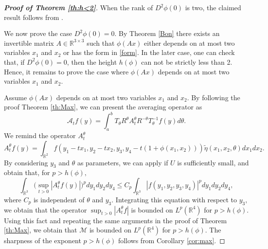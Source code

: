 \documentclass[a4paper, 11pt]{article}
\theoremstyle{plain}
\theoremstyle{definition}
\theoremstyle{lemma}
\theoremstyle{Remark}
\theoremstyle{proposition}
\theoremstyle{corollary}
\theoremstyle{example}
\theoremstyle{assumption}
\begin{document}
\bigskip

\begin{proof}[\textbf{Proof of Theorem \ref{th:h<2}}]
When the rank of $D^2\phi(0)$ is two, the claimed result follows from \cite[Theorem 2]{Gr}.

We now prove the case $D^2 \phi(0)=0.$
By Theorem \ref{Bon} there exists an invertible matrix $A\in \mathbb{R}^{3\times 3}$ such that
$ \phi(Ax)$ either depends on at most two variables $x_1$ and $x_2$ or has the form in \eqref{form}.
 In the later case, one can check that, if $D^2 \phi(0)=0$, then the height $h(\phi)$ can not be strictly less than 2. Hence, it remains to prove the case where $ \phi(Ax)$  depends on at most two variables $x_1$ and $x_2.$




 Assume $ \phi(Ax)$ depends on at most two variables $x_1$ and $x_2$. By following the proof Theorem \ref{th:Max}, we can present the averaging operator as
$$\mathcal{A}_t f(y)=\int_a^b T_{\theta}R^{\theta}{A}_t^{\theta}R^{-\theta}T_{\theta}^{-1} f(y)d\theta. $$
We remind the operator ${A}_t^{\theta}$
$$ {A}_t^{\theta} f(y)=
\int_{\mathbb{R}^2}f(y_1-tx_1,y_2-tx_2,y_3, y_4-t(1+ \phi(x_1,x_2))) \tilde{\eta} (x_1,x_2, \theta)dx_1dx_2.$$
 By considering $y_3$ and $\theta$ as  parameters, we can apply \cite[Theorem 1.2]{P1} if $U$ is sufficiently small, and obtain that, for $p>h(\phi),$
\begin{equation*}\int_{\mathbb{R}^3}\big(\sup_{t>0}|A^{\theta}_tf(y)| \big)^pdy_1dy_2dy_4\leq C_p \int_{\mathbb{R}^3}|f(y_1,y_2,y_3,y_4)|^pdy_1dy_2dy_4,
\end{equation*}
where $C_p$ is independent of  $\theta$ and $y_3.$
 Integrating this equation with respect to  $y_3,$ we obtain that the operator $\sup_{t>0}|{A}_t^{\theta}f|$ is bounded on $L^p(\mathbb{R}^4)$ for $p> h(\phi).$ Using this fact and repeating the same arguments in the proof of Theorem \ref{th:Max}, we obtain that $\mathcal{M}$ is bounded on $L^p(\mathbb{R}^4)$ for $p>h(\phi).$ The sharpness of the exponent $p>h(\phi)$ follows from Corollary \ref{cor:max}.


\end{proof}
\end{document}
